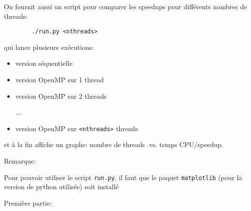 \documentclass{beamer}
\begin{document}
\begin{frame}[fragile]
	On fournit aussi un script pour comparer les speedups pour différents nombres de threads:
	
	{\color{blue}\begin{verbatim}
		./run.py <nthreads>
		\end{verbatim}
	}
	qui lance plusieurs exécutions:
	\begin{itemize}
		\item version séquentielle
		\item version OpenMP sur 1 thread
		\item version OpenMP sur 2 threads
		
		...
		\item version OpenMP sur \verb|<nthreads>| threads
	\end{itemize}
	
	et à la fin affiche un graphe: nombre de threads .vs. temps CPU/speedup.
	
	\vfill
	Remarque:
	\medskip
	
	\hspace{1cm}\begin{minipage}{0.9\textwidth}
		Pour pouvoir utiliser le script {\tt run.py},
		il faut que le paquet {\tt matplotlib} (pour la version de python utilisée) soit installé
	\end{minipage}
	
\end{frame}

\begin{frame}
	Première partie:
\bigskip


\end{frame}
\end{document}
